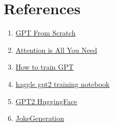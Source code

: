 \documentclass[12pt]{article}
\begin{document}
\section{References}
\begin{enumerate}
    \item \href{https://www.youtube.com/watch?v=kCc8FmEb1nY&t=1694s}{GPT From Scratch}
    \item \href{https://arxiv.org/abs/1706.03762}{Attention is All You Need}
    \item \href{https://habr.com/ru/companies/neoflex/articles/722584/}{How to train GPT}
    \item \href{https://www.kaggle.com/code/suraj520/pytorch-train-gpt2-and-generate-text-from-it}{kaggle gpt2 training notebook}
    \item \href{https://huggingface.co/gpt2}{GPT2 HuggingFace}
    \item \href{https://github.com/Maves1/IU_NLP_Joke_Generator/tree/main}{JokeGeneration}
\end{enumerate}
\end{document}
